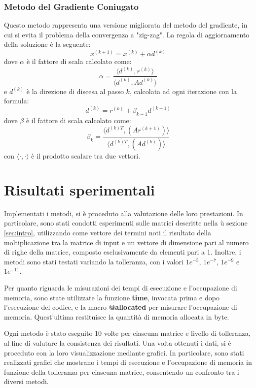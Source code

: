 \subsubsection{Metodo del Gradiente Coniugato}
Questo metodo rappresenta una versione migliorata del metodo del gradiente, in
cui si evita il problema della convergenza a "zig-zag". La regola di aggiornamento
della soluzione è la seguente:
\begin{equation}
    x^{(k+1)} = x^{(k)} + \alpha d^{(k)}
\end{equation}
dove $\alpha$ è il fattore di scala calcolato come:
\begin{equation}
    \alpha = \frac{\langle d^{(k)}, r^{(k)}\rangle}{\langle d^{(k)}, Ad^{(k)}\rangle}
\end{equation}
e $d^{(k)}$ è la direzione di discesa al passo $k$, calcolata ad ogni iterazione
con la formula:
\begin{equation}
    d^{(k)} = r^{(k)} + \beta_{k-1} d^{(k-1)}
\end{equation}
dove $\beta$ è il fattore di scala calcolato come:
\begin{equation}
    \beta_k = \frac{\langle d^{(k)T}, (Ar^{(k + 1)})\rangle}{\langle d^{(k)T}, (Ad^{(k)})\rangle}
\end{equation}
con $\langle \cdot, \cdot \rangle$ è il prodotto scalare tra due vettori.

\section{Risultati sperimentali}
Implementati i metodi, si è proceduto alla valutazione delle loro prestazioni.
In particolare, sono stati condotti esperimenti sulle matrici descritte nella ù
sezione \ref{sec:intro}, utilizzando come vettore dei termini noti il risultato
della moltiplicazione tra la matrice di input e un vettore di dimensione pari al
numero di righe della matrice, composto esclusivamente da elementi pari a 1.
Inoltre, i metodi sono stati testati variando la tolleranza, con i valori $1e^{-5}$,
$1e^{-7}$, $1e^{-9}$ e $1e^{-11}$.

Per quanto riguarda le misurazioni dei tempi di esecuzione e l'occupazione di
memoria, sono state utilizzate la funzione \textbf{time}, invocata prima e dopo
l'esecuzione del codice, e la macro \textbf{@allocated} per misurare l'occupazione
di memoria. Quest'ultima restituisce la quantità di memoria allocata in byte.

Ogni metodo è stato eseguito 10 volte per ciascuna matrice e livello di tolleranza,
al fine di valutare la consistenza dei risultati. Una volta ottenuti i dati, si è
proceduto con la loro visualizzazione mediante grafici. In particolare, sono stati
realizzati grafici che mostrano i tempi di esecuzione e l'occupazione di memoria
in funzione della tolleranza per ciascuna matrice, consentendo un confronto tra
i diversi metodi.

